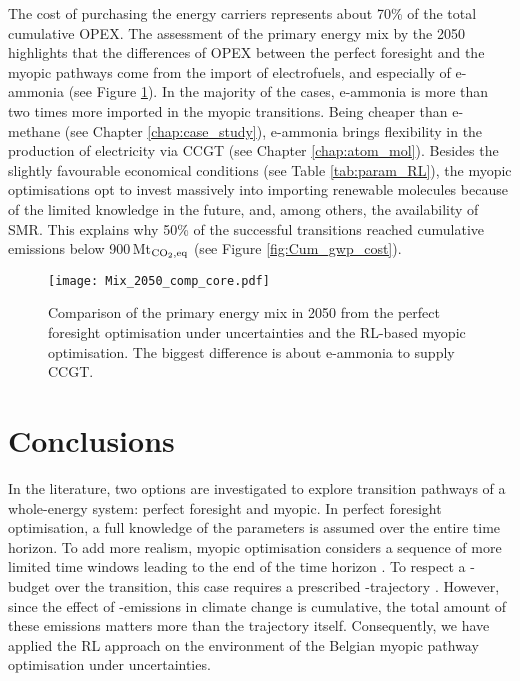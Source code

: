 The cost of purchasing the energy carriers represents about 70\% of the total cumulative \gls{OPEX}. The assessment of the primary energy mix by the 2050 highlights that the differences of OPEX between the perfect foresight and the myopic pathways come from the import of electrofuels, and especially of e-ammonia (see Figure \ref{fig:Mix_2050_comp}).  In the majority of the cases, e-ammonia is more than two times more imported in the myopic transitions. Being cheaper than e-methane (see Chapter \ref{chap:case_study}), e-ammonia brings flexibility in the production of electricity via \gls{CCGT} (see Chapter \ref{chap:atom_mol}). Besides the slightly favourable economical conditions (see Table \ref{tab:param_RL}), the myopic optimisations opt to invest massively into importing renewable molecules because of the limited knowledge in the future, and, among others, the availability of \gls{SMR}. This explains why 50\% of the successful transitions reached cumulative emissions below 900\,Mt$_{\ce{CO2},\text{eq}}$ (see Figure \ref{fig:Cum_gwp_cost}).

\begin{figure}[!htbp]
\centering
\texttt{[image: Mix\_2050\_comp\_core.pdf]}
\caption{Comparison of the primary energy mix in 2050 from the perfect foresight optimisation under uncertainties and the \gls{RL}-based myopic optimisation. The biggest difference is about e-ammonia to supply \gls{CCGT}.}
\label{fig:Mix_2050_comp}
\end{figure}


\section{Conclusions}
\label{sec:RL:conclusions}
In the literature, two options are investigated to explore transition pathways of a whole-energy system: perfect foresight and myopic. In perfect foresight optimisation, a full knowledge of the parameters is assumed over the entire time horizon. To add more realism, myopic optimisation considers a sequence of more limited time windows leading to the end of the time horizon \cite{poncelet2016myopic}. To respect a -budget over the transition, this case requires a prescribed -trajectory \cite{fais2016impact}. However, since the effect of -emissions in climate change is cumulative, the total amount of these emissions matters more than the trajectory itself. Consequently, we have applied the \acrfull{RL} approach on the environment of the Belgian myopic pathway optimisation under uncertainties.

